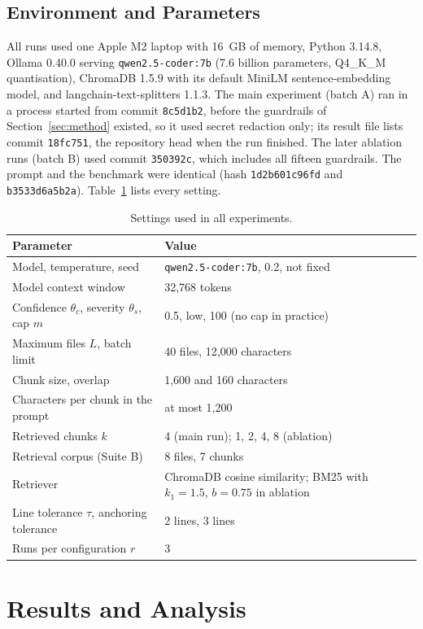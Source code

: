 \documentclass[12pt,onecolumn,draftclsnofoot]{IEEEtran}
\begin{document}
\subsection{Environment and Parameters}
All runs used one Apple M2 laptop with 16~GB of memory, Python 3.14.8, Ollama 0.40.0 serving \texttt{qwen2.5-coder:7b} (7.6 billion parameters, Q4\_K\_M quantisation), ChromaDB 1.5.9 with its default MiniLM sentence-embedding model, and langchain-text-splitters 1.1.3. The main experiment (batch A) ran in a process started from commit \texttt{8c5d1b2}, before the guardrails of Section~\ref{sec:method} existed, so it used secret redaction only; its result file lists commit \texttt{18fc751}, the repository head when the run finished. The later ablation runs (batch B) used commit \texttt{350392c}, which includes all fifteen guardrails. The prompt and the benchmark were identical (hash \texttt{1d2b601c96fd} and \texttt{b3533d6a5b2a}). Table~\ref{tab:params} lists every setting.

\begin{table}[!t]
\caption{Settings used in all experiments.}\label{tab:params}
\centering\small
\begin{tabular}{@{}p{2.5in}p{3.4in}@{}}
\toprule
Parameter & Value \\
\midrule
Model, temperature, seed & \texttt{qwen2.5-coder:7b}, 0.2, not fixed \\
Model context window & 32,768 tokens \\
Confidence $\theta_c$, severity $\theta_s$, cap $m$ & 0.5, low, 100 (no cap in practice) \\
Maximum files $L$, batch limit & 40 files, 12,000 characters \\
Chunk size, overlap & 1,600 and 160 characters \\
Characters per chunk in the prompt & at most 1,200 \\
Retrieved chunks $k$ & 4 (main run); 1, 2, 4, 8 (ablation) \\
Retrieval corpus (Suite B) & 8 files, 7 chunks \\
Retriever & ChromaDB cosine similarity; BM25 with $k_1=1.5$, $b=0.75$ in ablation \\
Line tolerance $\tau$, anchoring tolerance & 2 lines, 3 lines \\
Runs per configuration $r$ & 3 \\
\bottomrule
\end{tabular}
\end{table}

\section{Results and Analysis}\label{sec:results}
\end{document}
